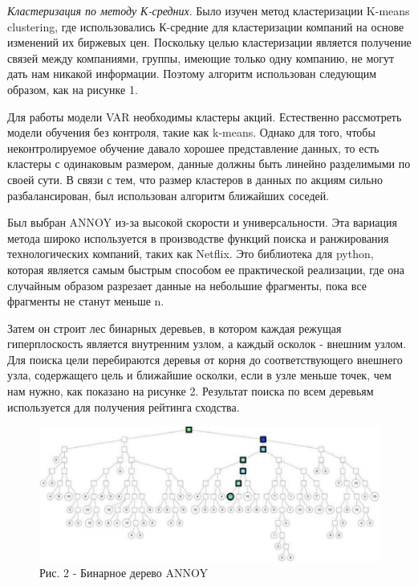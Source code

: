 \begin{multicols}{2}
\emph{Кластеризация по методу К-средних}. Было изучен метод
кластеризации K-means clustering, где использовались К-средние для
кластеризации компаний на основе изменений их биржевых цен. Поскольку
целью кластеризации является получение связей между компаниями, группы,
имеющие только одну компанию, не могут дать нам никакой информации.
Поэтому алгоритм использован следующим образом, как на рисунке 1.

Для работы модели VAR необходимы кластеры акций. Естественно рассмотреть
модели обучения без контроля, такие как k-means. Однако для того, чтобы
неконтролируемое обучение давало хорошее представление данных, то есть
кластеры с одинаковым размером, данные должны быть линейно разделимыми
по своей сути. В связи с тем, что размер кластеров в данных по акциям
сильно разбалансирован, был использован алгоритм ближайших соседей.

Был выбран ANNOY из-за высокой скорости и универсальности. Эта вариация
метода широко используется в производстве функций поиска и ранжирования
технологических компаний, таких как Netflix. Это библиотека для python,
которая является самым быстрым способом ее практической реализации, где
она случайным образом разрезает данные на небольшие фрагменты, пока все
фрагменты не станут меньше n.

Затем он строит лес бинарных деревьев, в котором каждая режущая
гиперплоскость является внутренним узлом, а каждый осколок - внешним
узлом. Для поиска цели перебираются деревья от корня до соответствующего
внешнего узла, содержащего цель и ближайшие осколки, если в узле меньше
точек, чем нам нужно, как показано на рисунке 2. Результат поиска по
всем деревьям используется для получения рейтинга сходства.
\end{multicols}

\begin{figure}[H]
	\centering
	\includegraphics[width=\textwidth]{media/ict2/image4}
	\caption*{Рис. 2 - Бинарное дерево ANNOY}
\end{figure}

